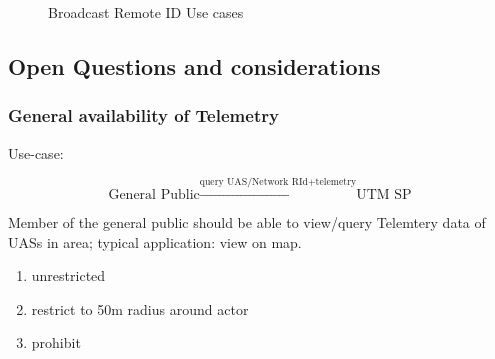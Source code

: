 \documentclass{ua_wgs_base}
\begin{document}
\begin{figure}[tbh]
\begin{centering}
\par\end{centering}
\caption{Broadcast Remote ID Use cases}
\end{figure}

\subsection{Open Questions and considerations}

\subsubsection{General availability of Telemetry\label{subsec:availability-Telemetry}}

Use-case: 

\[
\text{General Public}\ensuremath{\xrightarrow{\text{query UAS/Network RId+telemetry}}}\text{UTM SP}
\]
 

Member of the general public should be able to view/query Telemtery
data of UASs in area; typical application: view on map.

\begin{enumerate}
\item unrestricted
\item restrict to 50m radius around actor
\item prohibit
\end{enumerate}
\end{document}
